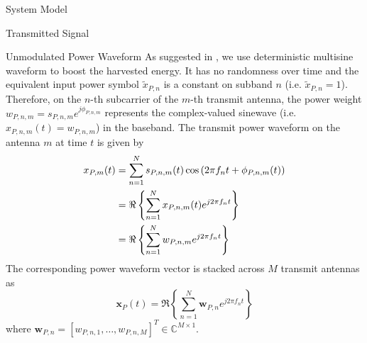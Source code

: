 \documentclass{IEEEtran}
\begin{document}
\begin{section} {System Model}
\begin{subsection}	{Transmitted Signal}
		\begin{subsubsection} {Unmodulated Power Waveform}
			As suggested in \cite{Clerckx2018b,Clerckx2016a}, we use deterministic multisine waveform to boost the harvested energy. It has no randomness over time and the equivalent input power symbol $\tilde{x}_{P,n}$ is a constant on subband $n$ (i.e. $\tilde{x}_{P,n} = 1$). Therefore, on the $n$-th subcarrier of the $m$-th transmit antenna, the power weight $w_{P,n,m} = s_{P,n,m} e^{j\phi_{P,n,m}}$ represents the complex-valued sinewave (i.e. $x_{P,n,m}(t) = w_{P,n,m}$) in the baseband. The transmit power waveform on the antenna $m$ at time $t$ is given by
			\begin{equation}	\label{eq:x{P,m}(t)}
				\begin{split}
					x_{P,m}(t)
					&= \sum_{n=1}^{N} s_{P,n,m}(t) \cos \left( 2 \pi f_n t + \phi_{P,n,m}(t) \right)	\\
					&= \Re \left\{ \sum_{n=1}^{N} x_{P,n,m}(t) e^{j2 \pi f_n t} \right\}	\\
					&= \Re \left\{ \sum_{n=1}^{N} w_{P,n,m} e^{j2 \pi f_n t} \right\}
				\end{split}
			\end{equation}
			The corresponding power waveform vector is stacked across $M$ transmit antennas as
			\begin{equation}	\label{eq:x_P(t)}
				\boldsymbol{x}_P(t) = \Re \left\{ \sum_{n=1}^{N} \boldsymbol{w}_{P,n} e^{j2{\pi}{f_n}t} \right\}
			\end{equation}
			where $\boldsymbol{w}_{P,n}=[w_{P,n,1},\dots,w_{P,n,M}]^T \in \mathbb{C}^{M \times 1}$.
		\end{subsubsection}


\end{subsection}
\end{section}
\end{document}
